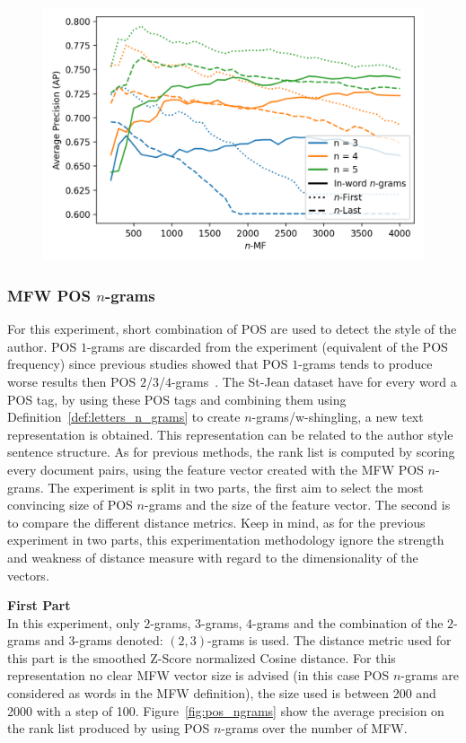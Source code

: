 \begin{figure}
  \label{fig:first_last_letters_ngrams_st_jean}
  \includegraphics[width=\linewidth]{img/first_last_letters_ngrams_st_jean.png}
\end{figure}

\subsubsection{MFW POS $n$-grams}

For this experiment, short combination of POS are used to detect the style of the author.
POS $1$-grams are discarded from the experiment (equivalent of the POS frequency) since previous studies showed that POS $1$-grams tends to produce worse results then POS $2$/$3$/$4$-grams~\cite{kocher_linking}.
The St-Jean dataset have for every word a POS tag, by using these POS tags and combining them using Definition~\ref{def:letters_n_grams} to create $n$-grams/w-shingling, a new text representation is obtained.
This representation can be related to the author style sentence structure.
As for previous methods, the rank list is computed by scoring every document pairs, using the feature vector created with the MFW POS $n$-grams.
The experiment is split in two parts, the first aim to select the most convincing size of POS $n$-grams and the size of the feature vector.
The second is to compare the different distance metrics.
Keep in mind, as for the previous experiment in two parts, this experimentation methodology ignore the strength and weakness of distance measure with regard to the dimensionality of the vectors.

\textbf{First Part}\\
In this experiment, only $2$-grams, $3$-grams, $4$-grams and the combination of the $2$-grams and $3$-grams denoted: $(2, 3)$-grams is used.
The distance metric used for this part is the smoothed Z-Score normalized Cosine distance.
For this representation no clear MFW vector size is advised (in this case POS $n$-grams are considered as words in the MFW definition), the size used is between 200 and 2000 with a step of 100.
Figure~\ref{fig:pos_ngrams} show the average precision on the rank list produced by using POS $n$-grams over the number of MFW.

